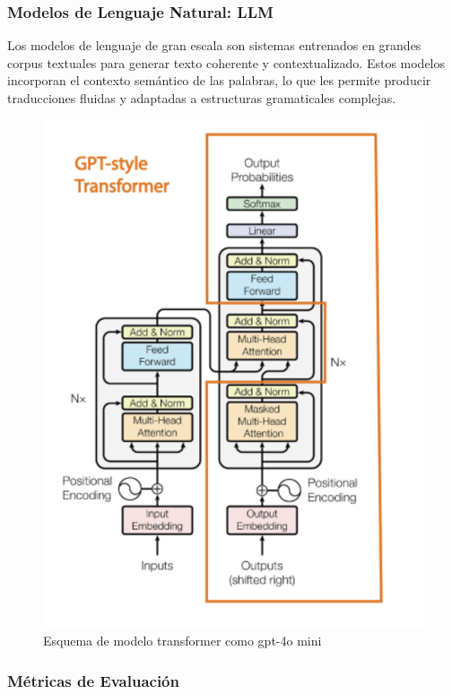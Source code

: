 \documentclass{article}
\begin{document}
\subsubsection{Modelos de Lenguaje Natural: LLM}

Los modelos de lenguaje de gran escala son sistemas entrenados en grandes corpus textuales para generar texto coherente y contextualizado. Estos modelos incorporan el contexto semántico de las palabras, lo que les permite producir traducciones fluidas y adaptadas a estructuras gramaticales complejas.

\begin{figure}[!hbtp]
    \centering
    \includegraphics[width=5in]{figuras/Gpt_style_Transformer.png}
		\caption{Esquema de modelo transformer como gpt-4o mini}
		\label{fig4}
\end{figure}

\subsubsection{Métricas de Evaluación}
\end{document}
